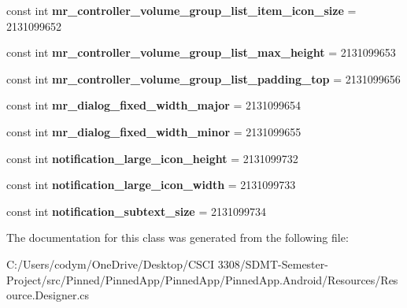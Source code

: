 \begin{DoxyCompactItemize}
const int {\bfseries mr\+\_\+controller\+\_\+volume\+\_\+group\+\_\+list\+\_\+item\+\_\+icon\+\_\+size} = 2131099652
\item 
\mbox{\label{class_pinned_app_1_1_droid_1_1_resource_1_1_dimension_a887fe77ecbeda8b0f18203e5ee5094d7}} 
const int {\bfseries mr\+\_\+controller\+\_\+volume\+\_\+group\+\_\+list\+\_\+max\+\_\+height} = 2131099653
\item 
\mbox{\label{class_pinned_app_1_1_droid_1_1_resource_1_1_dimension_a047d16536c5fd10e98c6b26e0f505e12}} 
const int {\bfseries mr\+\_\+controller\+\_\+volume\+\_\+group\+\_\+list\+\_\+padding\+\_\+top} = 2131099656
\item 
\mbox{\label{class_pinned_app_1_1_droid_1_1_resource_1_1_dimension_a8864488cd8ef6f26f0eb21e6feee1ec3}} 
const int {\bfseries mr\+\_\+dialog\+\_\+fixed\+\_\+width\+\_\+major} = 2131099654
\item 
\mbox{\label{class_pinned_app_1_1_droid_1_1_resource_1_1_dimension_a167d646bbf731cc3470324663b38fd70}} 
const int {\bfseries mr\+\_\+dialog\+\_\+fixed\+\_\+width\+\_\+minor} = 2131099655
\item 
\mbox{\label{class_pinned_app_1_1_droid_1_1_resource_1_1_dimension_a8c37859081149115fe72532665c6ff33}} 
const int {\bfseries notification\+\_\+large\+\_\+icon\+\_\+height} = 2131099732
\item 
\mbox{\label{class_pinned_app_1_1_droid_1_1_resource_1_1_dimension_a22410b55bd2dd54cca95ac8bdb2f725f}} 
const int {\bfseries notification\+\_\+large\+\_\+icon\+\_\+width} = 2131099733
\item 
\mbox{\label{class_pinned_app_1_1_droid_1_1_resource_1_1_dimension_ae6b8ebed85dc4318e976039727e8c45a}} 
const int {\bfseries notification\+\_\+subtext\+\_\+size} = 2131099734
\end{DoxyCompactItemize}


The documentation for this class was generated from the following file\+:\begin{DoxyCompactItemize}
\item 
C\+:/\+Users/codym/\+One\+Drive/\+Desktop/\+C\+S\+C\+I 3308/\+S\+D\+M\+T-\/\+Semester-\/\+Project/src/\+Pinned/\+Pinned\+App/\+Pinned\+App/\+Pinned\+App.\+Android/\+Resources/Resource.\+Designer.\+cs\end{DoxyCompactItemize}
